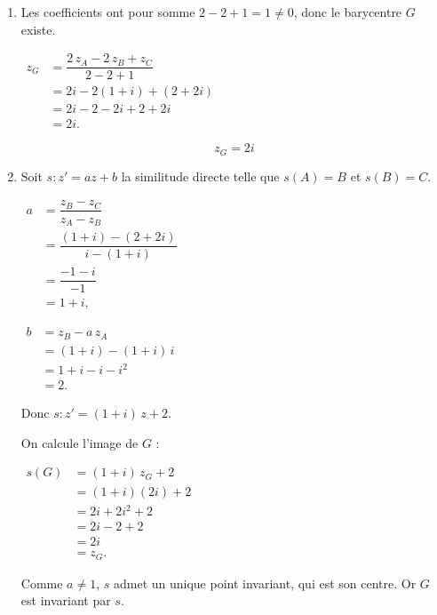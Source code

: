 \documentclass[12pt,a4paper]{article}
\begin{document}
\begin{enumerate}

    \item Les coefficients ont pour somme $2 - 2 + 1 = 1 \neq 0$, donc le barycentre $G$ existe.

    $
    \begin{aligned}
    z_G &= \dfrac{2\,z_A - 2\,z_B + z_C}{2 - 2 + 1} \\[1mm]
        &= 2i - 2(1 + i) + (2 + 2i) \\[1mm]
        &= 2i - 2 - 2i + 2 + 2i \\[1mm]
        &= 2i.
    \end{aligned}
    $

    \[
    \boxed{z_G = 2i}
    \]

    \item Soit $s : z' = az + b$ la similitude directe telle que $s(A) = B$ et $s(B) = C$.

    $
    \begin{aligned}
    a &= \dfrac{z_B - z_C}{z_A - z_B} \\[1mm]
      &= \dfrac{(1 + i) - (2 + 2i)}{i - (1 + i)} \\[1mm]
      &= \dfrac{-1 - i}{-1} \\[1mm]
      &= 1 + i,
    \end{aligned}
    $

    $
    \begin{aligned}
    b &= z_B - a\,z_A \\[1mm]
      &= (1 + i) - (1 + i)\,i \\[1mm]
      &= 1 + i - i - i^2 \\[1mm]
      &= 2.
    \end{aligned}
    $

    Donc $s : z' = (1 + i)\,z + 2$.

    On calcule l'image de $G$ :

    $
    \begin{aligned}
    s(G) &= (1 + i)\,z_G + 2 \\[1mm]
         &= (1 + i)(2i) + 2 \\[1mm]
         &= 2i + 2i^2 + 2 \\[1mm]
         &= 2i - 2 + 2 \\[1mm]
         &= 2i \\[1mm]
         &= z_G.
    \end{aligned}
    $

    Comme $a \neq 1$, $s$ admet un unique point invariant, qui est son centre. Or $G$ est invariant par $s$.


\end{enumerate}
\end{document}
